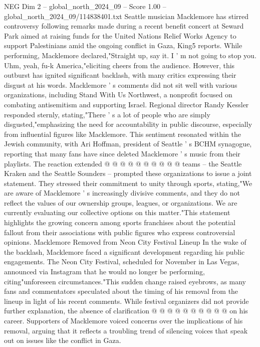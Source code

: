 \begin{textsample}{NEG Dim 2 – global\_north\_2024\_09 – Score 1.00 – global\_north\_2024\_09/114838401.txt}  \label{ex:f2_neg_318}
Seattle musician Macklemore has stirred controversy following remarks made during a recent benefit concert at Seward Park aimed at raising funds for the United Nations Relief Works Agency to support Palestinians amid the ongoing conflict in Gaza, King5 reports.
While performing, Macklemore declared,"Straight up, say it.
I ' m not going to stop you.
Uhm, yeah, fu-k America,"eliciting cheers from the audience.
However, this outburst has ignited significant backlash, with many critics expressing their disgust at his words.
Macklemore ' s comments did not sit well with various organizations, including Stand With Us Northwest, a nonprofit focused on combating antisemitism and supporting Israel.
Regional director Randy Kessler responded sternly, stating,"There ' s a lot of people who are simply disgusted,"emphasizing the need for accountability in public discourse, especially from influential figures like Macklemore.
This sentiment resonated within the Jewish community, with Ari Hoffman, president of Seattle ' s BCHM synagogue, reporting that many fans have since deleted Macklemore ' s music from their playlists.
The reaction extended @ @ @ @ @ @ @ @ @ @ teams -- the Seattle Kraken and the Seattle Sounders -- prompted these organizations to issue a joint statement.
They stressed their commitment to unity through sports, stating,"We are aware of Macklemore ' s increasingly divisive comments, and they do not reflect the values of our ownership groups, leagues, or organizations.
We are currently evaluating our collective options on this matter."This statement highlights the growing concern among sports franchises about the potential fallout from their associations with public figures who express controversial opinions.
Macklemore Removed from Neon City Festival Lineup In the wake of the backlash, Macklemore faced a significant development regarding his public engagements.
The Neon City Festival, scheduled for November in Las Vegas, announced via Instagram that he would no longer be performing, citing"unforeseen circumstances."This sudden change raised eyebrows, as many fans and commentators speculated about the timing of his removal from the lineup in light of his recent comments.
While festival organizers did not provide further explanation, the absence of clarification @ @ @ @ @ @ @ @ @ @ on his career.
Supporters of Macklemore voiced concerns over the implications of his removal, arguing that it reflects a troubling trend of silencing voices that speak out on issues like the conflict in Gaza.

\end{textsample}
